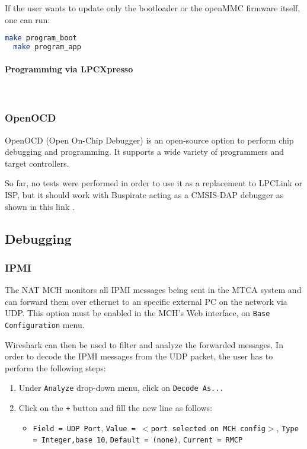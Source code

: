\documentclass[letterpaper,12pt, titlepage]{article}
\newcommand{\newparagraph}[1]{\paragraph{#1}\mbox{}\\}
\begin{document}
If the user wants to update only the bootloader or the openMMC firmware itself, one can run:

\begin{lstlisting}[language=bash]
  make program_boot
  make program_app
\end{lstlisting}


\newparagraph{Programming via LPCXpresso}


\subsubsection{OpenOCD}
OpenOCD (Open On-Chip Debugger) is an open-source option to perform chip debugging and programming. It supports a wide variety of programmers and target controllers.

So far, no tests were performed in order to use it as a replacement to LPCLink or ISP, but it should work with Buspirate acting as a CMSIS-DAP debugger as shown in this link \cite{buspirate-debug}.

\subsection{Debugging}

\subsubsection{IPMI}
The NAT MCH monitors all IPMI messages being sent in the MTCA system and can forward them over ethernet to an specific external PC on the network via UDP. This option must be enabled in the MCH's Web interface, on \texttt{Base Configuration} menu.

Wireshark can then be used to filter and analyze the forwarded messages. In order to decode the IPMI messages from the UDP packet, the user has to perform the following steps:

\begin{enumerate}
\item Under \texttt{Analyze} drop-down menu, click on \texttt{Decode As...}
\item Click on the \texttt{+} button and fill the new line as follows:
  \begin{itemize}
  \item \texttt{Field = UDP Port}, \texttt{Value = $<$port selected on MCH config$>$}, \texttt{Type = Integer,base 10}, \texttt{Default = (none)}, \texttt{Current = RMCP}
  \end{itemize}
\end{enumerate}
\end{document}
